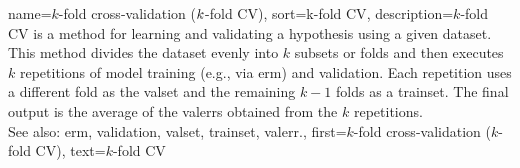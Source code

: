 {name={$k$-fold cross-validation ($k$-fold CV)},
sort={k-fold CV},
	description={$k$-fold CV is a 
		method for learning and validating a \gls{hypothesis} using a given \gls{dataset}. 
		This method divides the \gls{dataset} evenly into $k$ subsets or folds 
		and then executes $k$ repetitions of \gls{model} training (e.g., via \gls{erm}) and \gls{validation}. 
		Each repetition uses a different fold as the \gls{valset} and the remaining $k-1$ folds 
		as a \gls{trainset}. The final output is the average of the \glspl{valerr} obtained 
		from the $k$ repetitions.
				\\
		See also: \gls{erm}, \gls{validation}, \gls{valset}, \gls{trainset}, \gls{valerr}.},
	first={$k$-fold cross-validation ($k$-fold CV)},
	text={$k$-fold CV}
}

